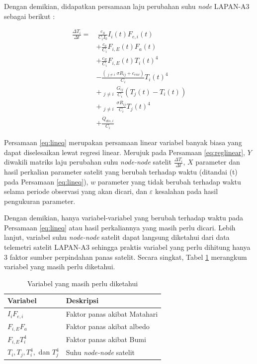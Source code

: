 Dengan demikian, didapatkan persamaan laju perubahan suhu \textit{node} LAPAN-A3 sebagai berikut :

\begin{equation}
\label{eq:lineq}
\begin{split}
	\frac{\Delta T_i}{\Delta t} = &\ \frac{c_S}{C_i I_0} I_{i}(t) F_{e,i}(t) \\
	&+ \frac{c_a}{C_i} F_{i,E}(t) F_a(t) \\
	&+ \frac{c_E}{C_i} F_{i,E}(t) T_{i}(t)^4 \\
	&- \frac{\left( \mathop{\sum_{j=1}^{N}}_{j \neq i} \sigma R_{ij} + c_{env} \right) }{C_i} T_{i}(t)^4 \\
	&+ \mathop{\sum_{j=1}^{N}}_{j \neq i} \frac{G_{ij}}{C_i} \left(T_j(t) - T_i(t)\right) \\
	&+ \mathop{\sum_{j=1}^{N}}_{j \neq i} \frac{\sigma R_{ij}}{C_i}T_{j}(t)^4 \\
	&+ \frac{\dot{Q}_{dis,i}}{C_i}
\end{split}
\end{equation}

Persamaan \ref{eq:lineq} merupakan persamaan linear variabel banyak biasa yang
dapat diselesaikan lewat regresi linear. Merujuk pada Persamaan
\ref{eq:reglinear}, $Y$ diwakili matriks laju perubahan suhu \textit{node-node}
satelit $\frac{\Delta T_i}{\Delta t}$, $X$ parameter dan hasil perkalian
parameter satelit yang berubah terhadap waktu (ditandai (t) pada Persamaan
\ref{eq:lineq}), $w$ parameter yang tidak berubah terhadap waktu selama periode
observasi yang akan dicari, dan $\varepsilon$ kesalahan pada hasil pengukuran parameter.  

Dengan demikian, hanya variabel-variabel yang berubah terhadap waktu pada
Persamaan \ref{eq:lineq} atau hasil perkaliannya yang masih perlu dicari.
Lebih lanjut, variabel suhu \textit{node-node} satelit dapat langsung
diketahui dari data telemetri satelit LAPAN-A3 sehingga praktis variabel yang
perlu dihitung hanya 3 faktor sumber perpindahan panas satelit. Secara singkat,
Tabel \ref{table:unknown} merangkum variabel yang masih perlu diketahui.

\begin{table}[!ht]
\begin{center}
\caption{Variabel yang masih perlu diketahui}
\label{table:unknown}
\begin{tabular}{|l|l|}
\hline
Variabel & Deskripsi \\ \hline
	$I_i F_{e,i}$        & Faktor panas akibat Matahari         \\ \hline
	$F_{i,E} F_a$        & Faktor panas akibat albedo         \\ \hline
	$F_{i,E} T_i^4$        & Faktor panas akibat Bumi         \\ \hline
	$T_i, T_j, T_i^4,$ dan $T_j^4$        & Suhu \textit{node-node} satelit         \\ \hline
\end{tabular}
\end{center}
\vspace{-5mm}
\end{table}


